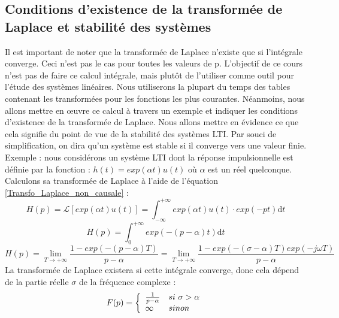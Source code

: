 \documentclass[]{report}
\newcommand{\deriv}{\mathrm{d}}
\begin{document}
	\subsection{Conditions d'existence de la transformée de Laplace et stabilité des systèmes}
	Il est important de noter que la transformée de Laplace n'existe que si l'intégrale converge. Ceci n'est pas le cas pour toutes les valeurs de p.
	L'objectif de ce cours n'est pas de faire ce calcul intégrale, mais plutôt de l'utiliser comme outil pour l'étude des systèmes linéaires. Nous utiliserons la plupart du temps des tables contenant les transformées pour les fonctions les plus courantes. Néanmoins, nous allons mettre en œuvre ce calcul à travers un exemple et indiquer les conditions d'existence de la transformée de Laplace. Nous allons mettre en évidence ce que cela signifie du point de vue de la stabilité des systèmes LTI. Par souci de simplification, on dira qu'un système est stable si il converge vers une valeur finie.
	Exemple : nous considérons un système LTI dont la réponse impulsionnelle est définie par la fonction : $h(t) = exp(\alpha t)u(t) $ où $\alpha$ est un réel quelconque.
	Calculons sa transformée de Laplace à l'aide de l'équation \ref{Transfo_Laplace_non_causale} :
	\begin{equation*}
	H(p) = \mathcal{L}[exp(\alpha t)u(t)] = \int_{-\infty}^{+\infty}exp(\alpha t)u(t) \cdot exp(-pt) \deriv t
	\end{equation*}
	\begin{equation*}
	H(p) = \int_{0}^{+\infty}exp(-(p-\alpha) t) \deriv t
	\end{equation*}
	\begin{equation*}
	H(p) = \lim_{T \to +\infty} \frac{1-exp(-(p-\alpha)T)}{p-\alpha} = \lim_{T \to +\infty} \frac{1-exp(-(\sigma-\alpha)T)exp(-j\omega T)}{p-\alpha}
	\end{equation*}
	La transformée de Laplace existera si cette intégrale converge, donc cela dépend de la partie réelle $\sigma$ de la fréquence complexe :
	\begin{equation}\label{}
	F(p) = \left \{
	\begin{array}{l l}
	\frac{1}{p-\alpha}  & si~\sigma>\alpha \\
	\infty   & sinon \\
	\end{array}
	\right .	 	
	\end{equation}
	
\end{document}
